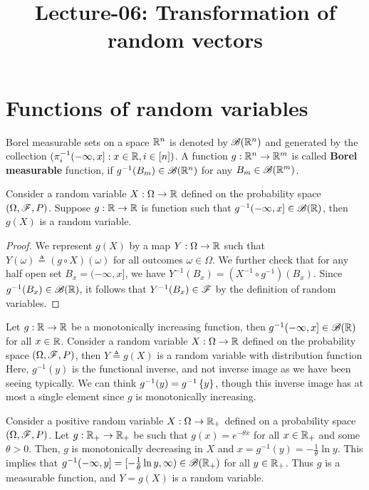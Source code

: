 \documentclass[letterpaper,10pt,english]{article}
\title{Lecture-06: Transformation of random vectors}
\author{}
\begin{document}
\maketitle

\section{Functions of random variables}
\begin{defn}
Borel measurable sets on a space $\mathbb{R}^n$ is denoted by $\mathscr{B}(\mathbb{R}^n)$ and generated by the collection $(\pi_i^{-1}(-\infty,x]: x \in \mathbb{R}, i \in [n])$. 
A function $g: \mathbb{R}^n\to \mathbb{R}^m$ is called \textbf{Borel measurable} function, 
if $g^{-1}(B_m) \in \mathscr{B}(\mathbb{R}^n)$ for any $B_m \in \mathscr{B}(\mathbb{R}^m)$. 
\end{defn}
\begin{prop}
Consider a random variable $X: \Omega \to \mathbb{R}$ defined on the probability space $(\Omega, \mathscr{F}, P)$. 
Suppose $g: \mathbb{R} \to \mathbb{R}$ is function such that $g^{-1}(-\infty, x] \in \mathscr{B}(\mathbb{R})$, 
then $g(X)$ is a random variable. 
\end{prop}
\begin{proof}
We represent $g(X)$ by a map $Y: \Omega \to \mathbb{R}$ such that $Y(\omega) \triangleq (g \circ X)(\omega)$ for all outcomes $\omega \in \Omega$. 
We further check that for any half open set $B_x = (-\infty,x]$, we have $Y^{-1}(B_x) = (X^{-1}\circ g^{-1})(B_x)$. 
Since $g^{-1}(B_x) \in \mathscr{B}(\mathbb{R})$, it follows that $Y^{-1}(B_x) \in \mathscr{F}$ by the definition of random variables.  
\end{proof}
\begin{shaded}
\begin{exmp} 
Let $g:\mathbb{R} \to \mathbb{R}$ be a monotonically increasing function, 
then $g^{-1}(-\infty, x] %
\in \sB(\R)$ for all $x \in \mathbb{R}$. 
Consider a random variable $X: \Omega \to \mathbb{R}$ defined on the probability space $(\Omega, \mathscr{F}, P)$, 
then $Y \triangleq g(X)$ is a random variable with distribution function
Here, $g^{-1}(y)$ is the functional inverse, and not inverse image as we have been seeing typically. 
We can think $g^{-1}(y) = g^{-1}\left\{y\right\}$, though this inverse image has at most a single element since $g$ is monotonically increasing. 
\end{exmp}
\end{shaded}
\begin{shaded}
\begin{exmp}
Consider a positive random variable $X: \Omega \to \mathbb{R}_+$ defined on a probability space $(\Omega,\mathscr{F},P)$.    
Let $g: \mathbb{R}_+ \to \mathbb{R}_+$ be such that $g(x) = e^{-\theta x}$ for all $x \in \mathbb{R}_+$ and some $\theta > 0$.  
Then, $g$ is monotonically decreasing in $X$ and $x = g^{-1}(y) = -\frac{1}{\theta}\ln y$. 
This implies that $g^{-1}(-\infty, y] = [-\frac{1}{\theta}\ln y, \infty) \in \mathscr{B}(\mathbb{R}_+)$ for all $y \in \mathbb{R}_+$. 
Thus $g$ is a measurable function, and $Y = g(X)$ is a random variable.  
\end{exmp}
\end{shaded}
\end{document}
